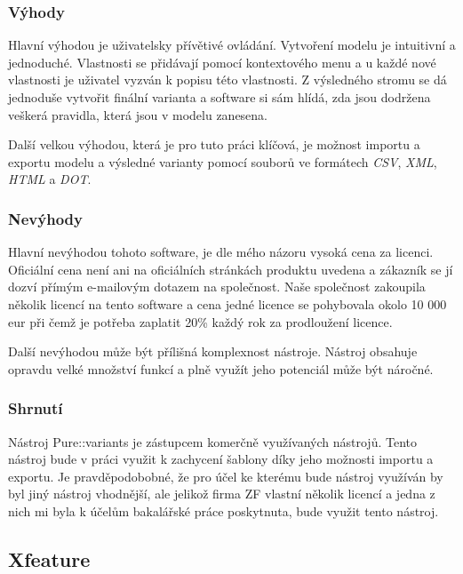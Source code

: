 \subsubsection{Výhody}

Hlavní výhodou je uživatelsky přívětivé ovládání. Vytvoření modelu je intuitivní a jednoduché. Vlastnosti se přidávají pomocí kontextového menu a u každé nové vlastnosti je uživatel vyzván k popisu této vlastnosti. Z výsledného stromu se dá jednoduše vytvořit finální varianta a software si sám hlídá, zda jsou dodržena veškerá pravidla, která jsou v modelu zanesena.

Další velkou výhodou, která je pro tuto práci klíčová, je možnost importu a exportu modelu a výsledné varianty pomocí souborů ve formátech \textit{CSV}, \textit{XML}, \textit{HTML} a \textit{DOT}. 

\subsubsection{Nevýhody}

Hlavní nevýhodou tohoto software, je dle mého názoru vysoká cena za licenci. Oficiální cena není ani na oficiálních stránkách produktu uvedena a zákazník se jí dozví přímým e-mailovým dotazem na společnost. Naše společnost zakoupila několik licencí na tento software a cena jedné licence se pohybovala okolo 10 000 eur při čemž je potřeba zaplatit 20\% každý rok za prodloužení licence. 

Další nevýhodou může být přílišná komplexnost nástroje. Nástroj obsahuje opravdu velké množství funkcí a plně využít jeho potenciál může být náročné. 

\subsubsection{Shrnutí}
Nástroj Pure::variants je zástupcem komerčně využívaných nástrojů. Tento nástroj bude v práci využit k zachycení šablony díky jeho možnosti importu a exportu. Je pravděpodobobné, že pro účel ke kterému bude nástroj využíván by byl jiný nástroj vhodnější, ale jelikož firma ZF vlastní několik licencí a jedna z nich mi byla k účelům bakalářské práce poskytnuta, bude využit tento nástroj.

\subsection{Xfeature}

